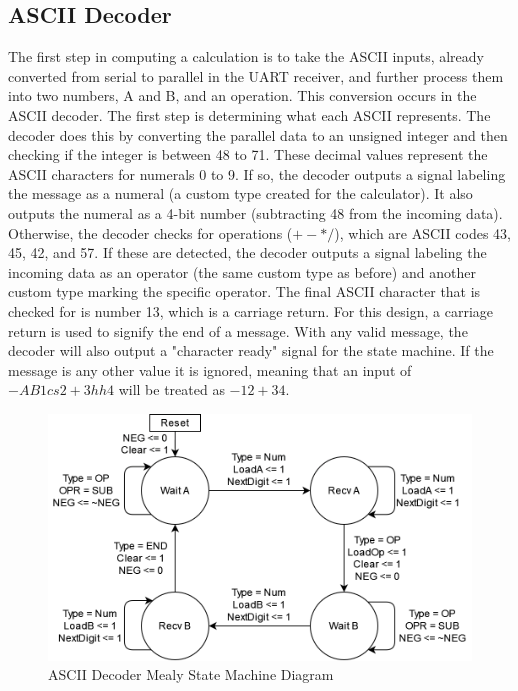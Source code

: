 \documentclass[11pt]{article}
\begin{document}
\subsection{ASCII Decoder}

The first step in computing a calculation is to take the ASCII inputs, already converted from serial to parallel in the UART receiver, and further process them into two numbers, A and B, and an operation.
This conversion occurs in the ASCII decoder.
The first step is determining what each ASCII represents.
The decoder does this by converting the parallel data to an unsigned integer and then checking if the integer is between 48 to 71.
These decimal values represent the ASCII characters for numerals 0 to 9.
If so, the decoder outputs a signal labeling the message as a numeral (a custom type created for the calculator).
It also outputs the numeral as a 4-bit number (subtracting 48 from the incoming data).
Otherwise, the decoder checks for operations ($+-*/$), which are ASCII codes 43, 45, 42, and 57.
If these are detected, the decoder outputs a signal labeling the incoming data as an operator (the same custom type as before) and another custom type marking the specific operator.
The final ASCII character that is checked for is number 13, which is a carriage return.
For this design, a carriage return is used to signify the end of a message.
With any valid message, the decoder will also output a "character ready" signal for the state machine.
If the message is any other value it is ignored, meaning that an input of $-AB1cs 2 + 3 hh4$ will be treated as $-12+34$.

\begin{figure}[H]        
    \centering
    \includegraphics[width=.5\textwidth]{DecoderSM.drawio.png}
    \caption{ASCII Decoder Mealy State Machine Diagram}
    \label{fig:decodersm}
\end{figure} 
\end{document}
